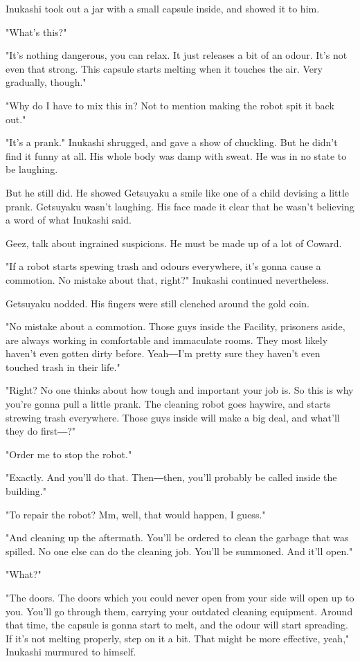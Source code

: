 Inukashi took out a jar with a small capsule inside, and showed it to
him.

"What's this?"

"It's nothing dangerous, you can relax. It just releases a bit of an
odour. It's not even that strong. This capsule starts melting when it
touches the air. Very gradually, though."

"Why do I have to mix this in? Not to mention making the robot spit it
back out."

"It's a prank." Inukashi shrugged, and gave a show of chuckling. But he
didn't find it funny at all. His whole body was damp with sweat. He was
in no state to be laughing.

But he still did. He showed Getsuyaku a smile like one of a child
devising a little prank. Getsuyaku wasn't laughing. His face made it
clear that he wasn't believing a word of what Inukashi said.

Geez, talk about ingrained suspicions. He must be made up of a lot of
Coward.

"If a robot starts spewing trash and odours everywhere, it's gonna cause
a commotion. No mistake about that, right?" Inukashi continued
nevertheless.

Getsuyaku nodded. His fingers were still clenched around the gold coin.

"No mistake about a commotion. Those guys inside the Facility, prisoners
aside, are always working in comfortable and immaculate rooms. They most
likely haven't even gotten dirty before. Yeah―I'm pretty sure they
haven't even touched trash in their life."

"Right? No one thinks about how tough and important your job is. So this
is why you're gonna pull a little prank. The cleaning robot goes
haywire, and starts strewing trash everywhere. Those guys inside will
make a big deal, and what'll they do first―?"

"Order me to stop the robot."

"Exactly. And you'll do that. Then―then, you'll probably be called
inside the building."

"To repair the robot? Mm, well, that would happen, I guess."

"And cleaning up the aftermath. You'll be ordered to clean the garbage
that was spilled. No one else can do the cleaning job. You'll be
summoned. And it'll open."

"What?"

"The doors. The doors which you could never open from your side will
open up to you. You'll go through them, carrying your outdated cleaning
equipment. Around that time, the capsule is gonna start to melt, and the
odour will start spreading. If it's not melting properly, step on it a
bit. That might be more effective, yeah," Inukashi murmured to himself.


